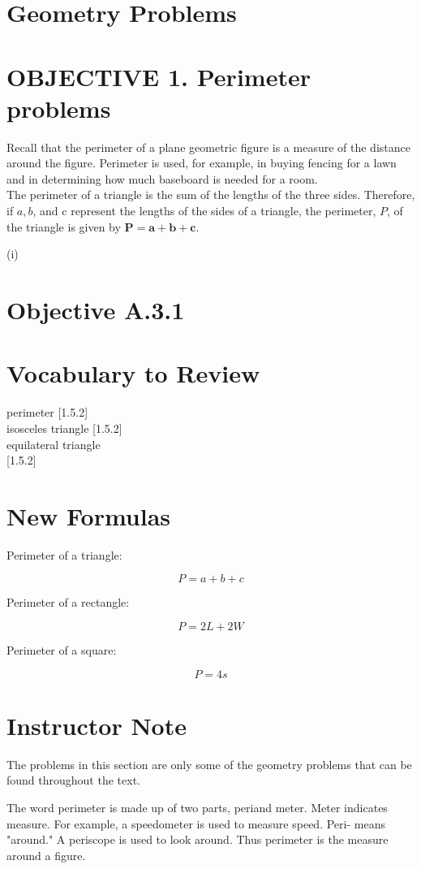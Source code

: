 \documentclass{ximera}
\begin{document}
\section*{Geometry Problems}
\section*{OBJECTIVE 1. Perimeter problems}
Recall that the perimeter of a plane geometric figure is a measure of the distance around the figure. Perimeter is used, for example, in buying fencing for a lawn and in determining how much baseboard is needed for a room.\\
The perimeter of a triangle is the sum of the lengths of the three sides. Therefore, if $a, b$, and c represent the lengths of the sides of a triangle, the perimeter, $P$, of the triangle is given by $\boldsymbol{P}=\boldsymbol{a}+\boldsymbol{b}+\boldsymbol{c}$.

(i)

\section*{Objective A.3.1}
\section*{Vocabulary to Review}
perimeter [1.5.2]\\[0pt]
isosceles triangle [1.5.2]\\
equilateral triangle\\[0pt]
[1.5.2]

\section*{New Formulas}
Perimeter of a triangle:

$$P=a+b+c$$

Perimeter of a rectangle:

$$P=2 L+2 W$$

Perimeter of a square:

$$P=4 s$$

\section*{Instructor Note}
The problems in this section are only some of the geometry problems that can be found throughout the text.

The word perimeter is made up of two parts, periand meter. Meter indicates measure. For example, a speedometer is used to measure speed. Peri- means "around." A periscope is used to look around. Thus perimeter is the measure around a figure.
\end{document}
